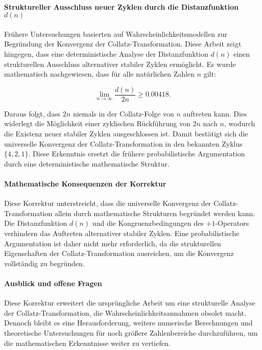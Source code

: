 \documentclass[a4paper,12pt]{article}
\begin{document}
\paragraph{Struktureller Ausschluss neuer Zyklen durch die Distanzfunktion \( d(n) \)}  
Frühere Untersuchungen basierten auf Wahrscheinlichkeitsmodellen zur Begründung der Konvergenz der Collatz-Transformation. Diese Arbeit zeigt hingegen, dass eine deterministische Analyse der Distanzfunktion \( d(n) \) einen strukturellen Ausschluss alternativer stabiler Zyklen ermöglicht. Es wurde mathematisch nachgewiesen, dass für alle natürlichen Zahlen \( n \) gilt:

\[
\lim_{n \to \infty} \frac{d(n)}{2n} \geq 0.00418.
\]

Daraus folgt, dass \( 2n \) niemals in der Collatz-Folge von \( n \) auftreten kann. Dies widerlegt die Möglichkeit einer zyklischen Rückführung von \( 2n \) nach \( n \), wodurch die Existenz neuer stabiler Zyklen ausgeschlossen ist. Damit bestätigt sich die universelle Konvergenz der Collatz-Transformation in den bekannten Zyklus \( \{4,2,1\} \). Diese Erkenntnis ersetzt die frühere probabilistische Argumentation durch eine deterministische mathematische Struktur.

\paragraph{Mathematische Konsequenzen der Korrektur}  
Diese Korrektur unterstreicht, dass die universelle Konvergenz der Collatz-Transformation allein durch mathematische Strukturen begründet werden kann. Die Distanzfunktion \( d(n) \) und die Kongruenzbedingungen des \(+1\)-Operators verhindern das Auftreten alternativer stabiler Zyklen. Eine probabilistische Argumentation ist daher nicht mehr erforderlich, da die strukturellen Eigenschaften der Collatz-Transformation ausreichen, um die Konvergenz vollständig zu begründen.

\paragraph{Ausblick und offene Fragen}  
Diese Korrektur erweitert die ursprüngliche Arbeit um eine strukturelle Analyse der Collatz-Transformation, die Wahrscheinlichkeitsannahmen obsolet macht. Dennoch bleibt es eine Herausforderung, weitere numerische Berechnungen und theoretische Untersuchungen für noch größere Zahlenbereiche durchzuführen, um die mathematischen Erkenntnisse weiter zu vertiefen.
\end{document}
